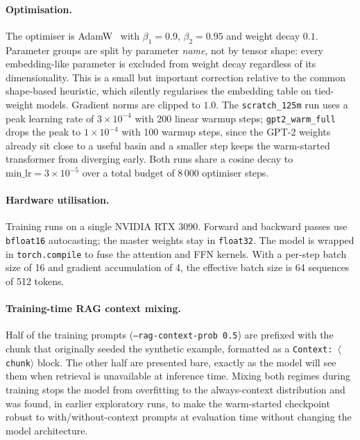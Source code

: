\paragraph{Optimisation.}
The optimiser is AdamW~\cite{loshchilov2019decoupled} with $\beta_1 = 0.9$, $\beta_2 = 0.95$
and weight decay $0.1$. Parameter groups are split by parameter \emph{name}, not by tensor
shape: every embedding-like parameter is excluded from weight decay regardless of its
dimensionality. This is a small but important correction relative to the common shape-based
heuristic, which silently regularises the embedding table on tied-weight models. Gradient
norms are clipped to $1.0$. The \texttt{scratch\_125m} run uses a peak learning rate of
$3 \times 10^{-4}$ with 200 linear warmup steps; \texttt{gpt2\_warm\_full} drops the peak to
$1 \times 10^{-4}$ with 100 warmup steps, since the GPT-2 weights already sit close to a
useful basin and a smaller step keeps the warm-started transformer from diverging early.
Both runs share a cosine decay to $\mathrm{min\_lr} = 3 \times 10^{-5}$ over a total budget
of 8\,000 optimiser steps.

\paragraph{Hardware utilisation.}
Training runs on a single NVIDIA RTX 3090. Forward and backward passes use \texttt{bfloat16}
autocasting; the master weights stay in \texttt{float32}. The model is wrapped in
\texttt{torch.compile} to fuse the attention and FFN kernels. With a per-step batch size of
16 and gradient accumulation of 4, the effective batch size is 64 sequences of 512 tokens.

\paragraph{Training-time RAG context mixing.}
Half of the training prompts (\texttt{--rag-context-prob 0.5}) are prefixed with the chunk
that originally seeded the synthetic example, formatted as a \texttt{Context: $\langle$chunk$\rangle$}
block. The other half are presented bare, exactly as the model will see them when retrieval
is unavailable at inference time. Mixing both regimes during training stops the model from
overfitting to the always-context distribution and was found, in earlier exploratory runs,
to make the warm-started checkpoint robust to with/without-context prompts at evaluation
time without changing the model architecture.

